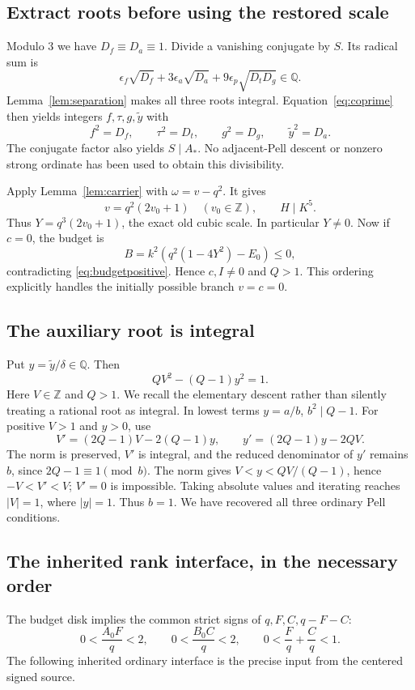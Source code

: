 \documentclass[11pt]{article}
\newcommand{\Z}{\mathbb Z}
\newcommand{\Q}{\mathbb Q}
\theoremstyle{definition}
\theoremstyle{remark}
\begin{document}
\subsection{Extract roots before using the restored scale}
Modulo $3$ we have $D_f\equiv D_a\equiv1$. Divide a vanishing
conjugate by $S$. Its radical sum is
\[
 \epsilon_f\sqrt{D_f}+3\epsilon_a\sqrt{D_a}
              +9\epsilon_p\sqrt{D_tD_g}\in\Q.
\]
Lemma~\ref{lem:separation} makes all three roots integral.
Equation~\eqref{eq:coprime} then yields integers $f,\tau,g,\widetilde y$
with
\begin{equation}\label{eq:extracted}
 f^2=D_f,\qquad \tau^2=D_t,\qquad g^2=D_g,
 \qquad \widetilde y^2=D_a.
\end{equation}
The conjugate factor also yields $S\mid A_*$. No adjacent-Pell
descent or nonzero strong ordinate has been used to obtain this
divisibility.

Apply Lemma~\ref{lem:carrier} with $\omega=v-q^2$. It gives
\begin{equation}\label{eq:scaledrecover}
 v=q^2(2v_0+1)\quad(v_0\in\Z),\qquad H\mid K^5.
\end{equation}
Thus $Y=q^3(2v_0+1)$, the exact old cubic scale. In particular
$Y\ne0$. Now if $c=0$, the budget is
\[
 B=k^2\left(q^2(1-4Y^2)-E_0\right)\le0,
\]
contradicting \eqref{eq:budgetpositive}. Hence $c,I\ne0$ and $Q>1$.
This ordering explicitly handles the initially possible branch
$v=c=0$.

\subsection{The auxiliary root is integral}
Put $y=\widetilde y/\delta\in\Q$. Then
\begin{equation}\label{eq:auxiliary}
 QV^2-(Q-1)y^2=1.
\end{equation}
Here $V\in\Z$ and $Q>1$. We recall the elementary descent rather
than silently treating a rational root as integral. In lowest terms
$y=a/b$, $b^2\mid Q-1$. For positive $V>1$ and $y>0$, use
\[
 V'=(2Q-1)V-2(Q-1)y,\qquad
 y'=(2Q-1)y-2QV.
\]
The norm is preserved, $V'$ is integral, and the reduced denominator
of $y'$ remains $b$, since $2Q-1\equiv1\pmod b$. The norm gives
$V<y<QV/(Q-1)$, hence $-V<V'<V$; $V'=0$ is impossible.
Taking absolute values and iterating reaches $|V|=1$, where $|y|=1$.
Thus $b=1$. We have recovered all three ordinary Pell conditions.

\subsection{The inherited rank interface, in the necessary order}
The budget disk implies the common strict signs of $q,F,C,q-F-C$:
\[
 0<\frac{A_0F}{q}<2,\qquad
 0<\frac{B_0C}{q}<2,\qquad
 0<\frac Fq+\frac Cq<1.
\]
The following inherited ordinary interface is the precise input from
the centered signed source\cite{incoming}.
\end{document}
